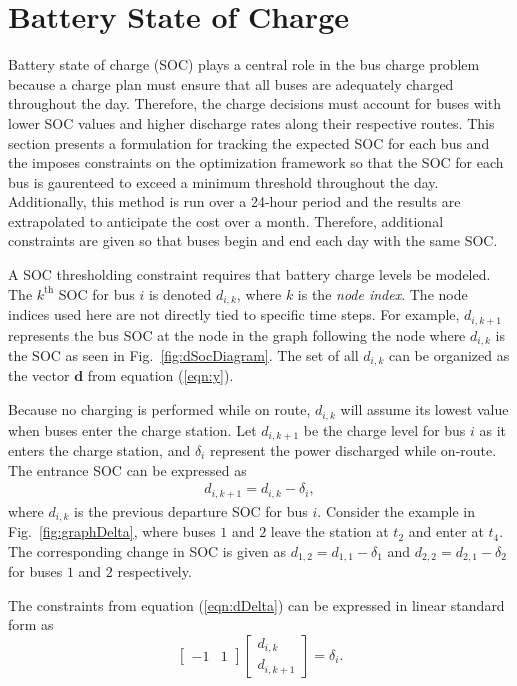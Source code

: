 \section{Battery State of Charge}
Battery state of charge (SOC) plays a central role in the bus charge
problem because a charge plan must ensure that all buses are adequately charged throughout the day. Therefore, the charge decisions must account for buses with lower SOC values and higher discharge rates along their respective routes. This section presents a formulation for tracking the expected SOC for each bus and the imposes constraints on the optimization framework so that the SOC for each bus is gaurenteed to exceed a minimum threshold throughout the day.  Additionally, this method is run over a 24-hour period and the results are extrapolated to anticipate the cost over a month. Therefore, additional constraints are given so that buses begin and end each day with the same SOC.  
\par A SOC thresholding constraint requires that battery charge levels
be modeled. The $k^{\text{th}}$ SOC for bus $i$ is denoted $d_{i,k}$,
where $k$ is the \textit{node index}. The node indices used here are
not directly tied to specific time steps.  For example, $d_{i,k+1}$
represents the bus SOC at the node in the graph following the node
where $d_{i,k}$ is the SOC as seen in Fig.~\ref{fig:dSocDiagram}. The set of all $d_{i,k}$ can be organized as the vector $\mathbf{d}$ from equation (\ref{eqn:y}).

\par Because no charging is performed while on route, $d_{i,k}$ will
assume its lowest value when buses enter the charge station. Let $d_{i,k+1}$ be the charge level for bus $i$ as it enters the charge station, and $\delta_i$ represent the power discharged while on-route. The entrance SOC can be expressed as 
\begin{align}\label{eqn:dDelta}
	d_{i,k+1} = d_{i,k} - \delta_i,
\end{align}
where $d_{i,k}$ is the previous departure SOC for bus $i$. Consider the example in Fig.~\ref{fig:graphDelta}, where buses $1$ and $2$ leave the station at $t_2$ and enter at $t_4$. The corresponding change in SOC is given as $d_{1,2} = d_{1,1} - \delta_1$ and $d_{2,2} = d_{2,1} - \delta_2$ for buses $1$ and $2$ respectively.

The constraints from equation (\ref{eqn:dDelta}) can be expressed in linear standard form as 
\begin{equation}\label{eqn:delta2}
	\begin{bmatrix}
		-1 & 1
	\end{bmatrix}
	\begin{bmatrix}
		d_{i,k} \\ d_{i,k+1}
	\end{bmatrix} = \delta_i.
\end{equation}
